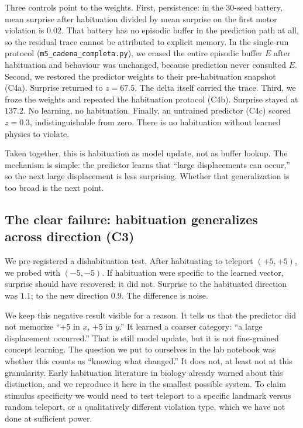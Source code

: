 \documentclass[11pt,a4paper]{article}
\begin{document}
Three controls point to the weights. First, persistence: in the 30-seed battery, mean surprise after habituation divided by mean surprise on the first motor violation is $0.02$. That battery has no episodic buffer in the prediction path at all, so the residual trace cannot be attributed to explicit memory. In the single-run protocol (\texttt{m5\_cadena\_completa.py}), we erased the entire episodic buffer $E$ after habituation and behaviour was unchanged, because prediction never consulted $E$. Second, we restored the predictor weights to their pre-habituation snapshot (C4a). Surprise returned to $z=67.5$. The delta itself carried the trace. Third, we froze the weights and repeated the habituation protocol (C4b). Surprise stayed at $137.2$. No learning, no habituation. Finally, an untrained predictor (C4c) scored $z=0.3$, indistinguishable from zero. There is no habituation without learned physics to violate.

Taken together, this is habituation as model update, not as buffer lookup. The mechanism is simple: the predictor learns that ``large displacements can occur,'' so the next large displacement is less surprising. Whether that generalization is too broad is the next point.

\subsection{The clear failure: habituation generalizes across direction (C3)}

We pre-registered a dishabituation test. After habituating to teleport $(+5,+5)$, we probed with $(-5,-5)$. If habituation were specific to the learned vector, surprise should have recovered; it did not. Surprise to the habituated direction was $1.1$; to the new direction $0.9$. The difference is noise.

We keep this negative result visible for a reason. It tells us that the predictor did not memorize ``+5 in $x$, +5 in $y$.'' It learned a coarser category: ``a large displacement occurred.'' That is still model update, but it is not fine-grained concept learning. The question we put to ourselves in the lab notebook was whether this counts as ``knowing what changed.'' It does not, at least not at this granularity. Early habituation literature in biology already warned about this distinction, and we reproduce it here in the smallest possible system. To claim stimulus specificity we would need to test teleport to a specific landmark versus random teleport, or a qualitatively different violation type, which we have not done at sufficient power.
\end{document}
